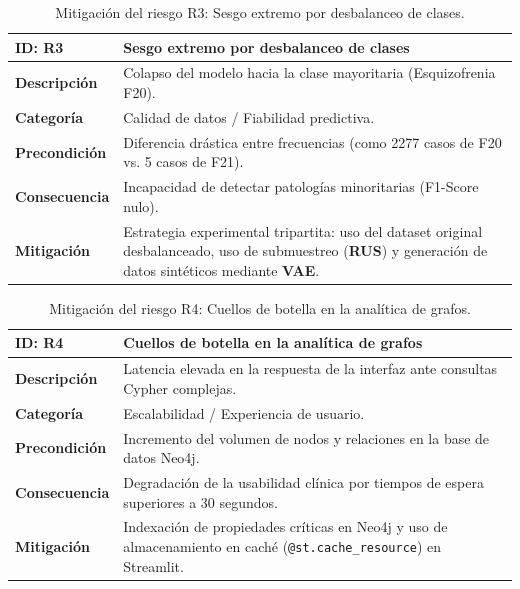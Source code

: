 \documentclass[12pt,a4paper,onecolumn,oneside]{report}
\begin{document}
\begin{table}[htbp]
\centering
\small
\begin{tabular}{|p{2.5cm}|p{10.5cm}|}
\hline
\rowcolor[RGB]{230,230,230} \textbf{ID: R3} & \textbf{Sesgo extremo por desbalanceo de clases} \\ \hline
\textbf{Descripción} & Colapso del modelo hacia la clase mayoritaria (Esquizofrenia F20). \\ \hline
\textbf{Categoría} & Calidad de datos / Fiabilidad predictiva. \\ \hline
\textbf{Precondición} & Diferencia drástica entre frecuencias (como 2277 casos de F20 vs. 5 casos de F21). \\ \hline
\textbf{Consecuencia} & Incapacidad de detectar patologías minoritarias (F1-Score nulo). \\ \hline
\textbf{Mitigación} & Estrategia experimental tripartita: uso del dataset original desbalanceado, uso de submuestreo (\textbf{RUS}) y generación de datos sintéticos mediante \textbf{VAE}. \\ \hline
\end{tabular}
\label{tab:R3}
\caption{Mitigación del riesgo R3: Sesgo extremo por desbalanceo de clases.}
\end{table}

\begin{table}[htbp]
\centering
\small
\begin{tabular}{|p{2.5cm}|p{10.5cm}|}
\hline
\rowcolor[RGB]{230,230,230} \textbf{ID: R4} & \textbf{Cuellos de botella en la analítica de grafos} \\ \hline
\textbf{Descripción} & Latencia elevada en la respuesta de la interfaz ante consultas Cypher complejas. \\ \hline
\textbf{Categoría} & Escalabilidad / Experiencia de usuario. \\ \hline
\textbf{Precondición} & Incremento del volumen de nodos y relaciones en la base de datos Neo4j. \\ \hline
\textbf{Consecuencia} & Degradación de la usabilidad clínica por tiempos de espera superiores a 30 segundos. \\ \hline
\textbf{Mitigación} & Indexación de propiedades críticas en Neo4j y uso de almacenamiento en caché (\texttt{@st.cache\_resource}) en Streamlit. \\ \hline
\end{tabular}
\label{tab:R4}
\caption{Mitigación del riesgo R4: Cuellos de botella en la analítica de grafos.}
\end{table}
\end{document}
